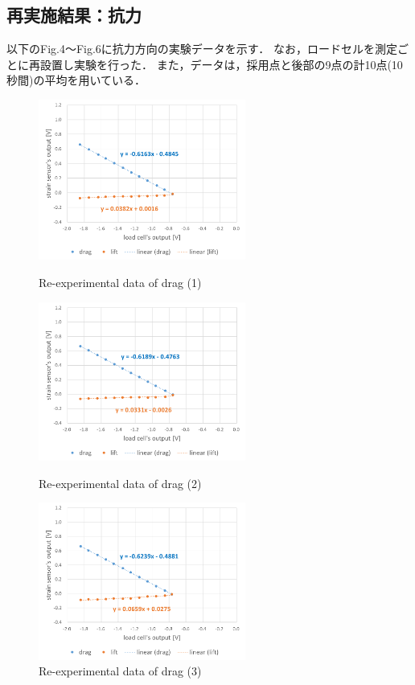 \documentclass[twocolumn,a4j]{jsarticle}
\begin{document}
\subsection{再実施結果：抗力}
以下のFig.4～Fig.6に抗力方向の実験データを示す．
なお，ロードセルを測定ごとに再設置し実験を行った．
また，データは，採用点と後部の9点の計10点(10秒間)の平均を用いている．
\begin{figure}[htbp]
    \footnotesize
    \begin{center}
        \includegraphics[width=68mm]{../images/graph_21119_drag_1.png}
        \caption{Re-experimental data of drag (1)}
        \includegraphics[width=68mm]{../images/graph_21119_drag_2.png}
        \caption{Re-experimental data of drag (2)}
        \includegraphics[width=68mm]{../images/graph_211111_drag_3.png}
        \caption{Re-experimental data of drag (3)}
    \end{center}
\end{figure}

\newpage
\end{document}
